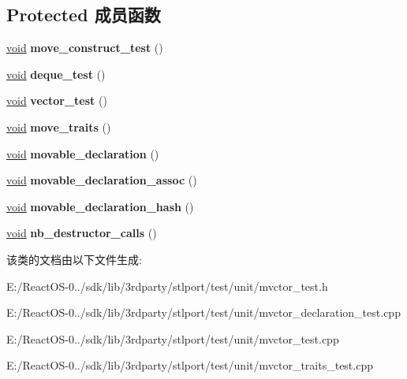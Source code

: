\subsection*{Protected 成员函数}
\begin{DoxyCompactItemize}
\item 
\mbox{\label{class_move_constructor_test_aa411bda5b438d7680a544ebe68058275}} 
\hyperlink{interfacevoid}{void} {\bfseries move\+\_\+construct\+\_\+test} ()
\item 
\mbox{\label{class_move_constructor_test_ac87cc132eecdab805e6ae337eed1be52}} 
\hyperlink{interfacevoid}{void} {\bfseries deque\+\_\+test} ()
\item 
\mbox{\label{class_move_constructor_test_a082106c7accd75f0a8d11723238237e9}} 
\hyperlink{interfacevoid}{void} {\bfseries vector\+\_\+test} ()
\item 
\mbox{\label{class_move_constructor_test_aa05bb5e0598cdcc26e42c0714329705e}} 
\hyperlink{interfacevoid}{void} {\bfseries move\+\_\+traits} ()
\item 
\mbox{\label{class_move_constructor_test_a3efffa5e8bce48b0c45d2bcf10886e15}} 
\hyperlink{interfacevoid}{void} {\bfseries movable\+\_\+declaration} ()
\item 
\mbox{\label{class_move_constructor_test_a5a570bb365d9e4c5586f9f0bb92d82ea}} 
\hyperlink{interfacevoid}{void} {\bfseries movable\+\_\+declaration\+\_\+assoc} ()
\item 
\mbox{\label{class_move_constructor_test_ab62d9a86a3d3958e87846d0d5194023a}} 
\hyperlink{interfacevoid}{void} {\bfseries movable\+\_\+declaration\+\_\+hash} ()
\item 
\mbox{\label{class_move_constructor_test_ac94516148a1c07628f7b2d858a9b9af8}} 
\hyperlink{interfacevoid}{void} {\bfseries nb\+\_\+destructor\+\_\+calls} ()
\end{DoxyCompactItemize}


该类的文档由以下文件生成\+:\begin{DoxyCompactItemize}
\item 
E\+:/\+React\+O\+S-\/0../sdk/lib/3rdparty/stlport/test/unit/mvctor\+\_\+test.\+h\item 
E\+:/\+React\+O\+S-\/0../sdk/lib/3rdparty/stlport/test/unit/mvctor\+\_\+declaration\+\_\+test.\+cpp\item 
E\+:/\+React\+O\+S-\/0../sdk/lib/3rdparty/stlport/test/unit/mvctor\+\_\+test.\+cpp\item 
E\+:/\+React\+O\+S-\/0../sdk/lib/3rdparty/stlport/test/unit/mvctor\+\_\+traits\+\_\+test.\+cpp\end{DoxyCompactItemize}
